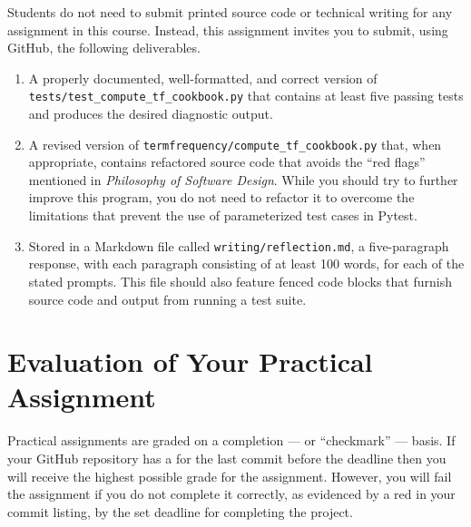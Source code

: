 \documentclass[11pt]{article}
\newcommand{\mainprogramsource}{\lstinline{termfrequency/compute_tf_cookbook.py}}
\newcommand{\testprogramsource}{\lstinline{tests/test_compute_tf_cookbook.py}}
\newcommand{\reflection}{\lstinline{writing/reflection.md}}
\newcommand{\philosophy}{{\em Philosophy of Software Design\/}}
\newcommand{\checkmark}{\ding{51}}
\newcommand{\naughtmark}{\ding{55}}
\begin{document}
\noindent Students do not need to submit printed source code or technical
writing for any assignment in this course. Instead, this assignment invites you
to submit, using GitHub, the following deliverables.

\vspace*{-.25em}

\begin{enumerate}

\setlength{\itemsep}{0in}

\item A properly documented, well-formatted, and correct version of
  \testprogramsource{} that contains at least five passing tests and produces
  the desired diagnostic output.

\item A revised version of \mainprogramsource{} that, when appropriate, contains
  refactored source code that avoids the ``red flags'' mentioned in \philosophy.
  While you should try to further improve this program, you do not need to
  refactor it to overcome the limitations that prevent the use of parameterized
  test cases in Pytest.

\item Stored in a Markdown file called \reflection{}, a five-paragraph response,
  with each paragraph consisting of at least 100 words, for each of the stated
  prompts. This file should also feature fenced code blocks that furnish source
  code and output from running a test suite.

\end{enumerate}

\vspace*{-1em}

\section*{Evaluation of Your Practical Assignment}


Practical assignments are graded on a completion --- or ``checkmark'' --- basis. If
your GitHub repository has a \checkmark{} for the last commit before the
deadline then you will receive the highest possible grade for the assignment.
However, you will fail the assignment if you do not complete it correctly, as
evidenced by a red \naughtmark{} in your commit listing, by the set deadline for
completing the project.

\end{document}

